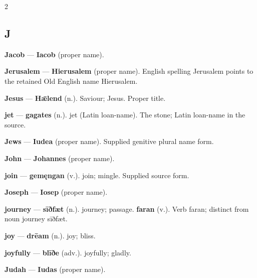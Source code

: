 \begin{multicols}{2}
\subsection*{J}
\textbf{Jacob} — \textbf{Iacob} (proper name).\par
\textbf{Jerusalem} — \textbf{Hierusalem} (proper name). English spelling Jerusalem points to the retained Old English name Hierusalem.\par
\textbf{Jesus} — \textbf{Hǣlend} (n.). Saviour; Jesus. Proper title.\par
\textbf{jet} — \textbf{gagates} (n.). jet (Latin loan-name). The stone; Latin loan-name in the source.\par
\textbf{Jews} — \textbf{Iudea} (proper name). Supplied genitive plural name form.\par
\textbf{John} — \textbf{Johannes} (proper name).\par
\textbf{join} — \textbf{gemęngan} (v.). join; mingle. Supplied source form.\par
\textbf{Joseph} — \textbf{Iosep} (proper name).\par
\textbf{journey} — \textbf{sīðfæt} (n.). journey; passage. \textbf{faran} (v.). Verb faran; distinct from noun journey sīðfæt.\par
\textbf{joy} — \textbf{drēam} (n.). joy; bliss.\par
\textbf{joyfully} — \textbf{blīðe} (adv.). joyfully; gladly.\par
\textbf{Judah} — \textbf{Iudas} (proper name).\par

\end{multicols}
